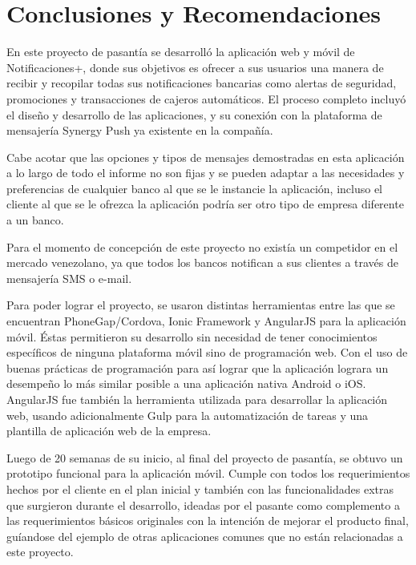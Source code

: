 \chapter{Conclusiones y Recomendaciones} 

\label{chap:conclusiones}

En este proyecto de pasantía se desarrolló la aplicación web y móvil de Notificaciones+, donde sus objetivos es ofrecer a sus usuarios una manera de recibir y recopilar todas sus notificaciones bancarias como alertas de seguridad, promociones y transacciones de cajeros automáticos. El proceso completo incluyó el diseño y desarrollo de las aplicaciones, y su conexión con la plataforma de mensajería Synergy Push ya existente en la compañía.


Cabe acotar que las opciones y tipos de mensajes demostradas en esta aplicación a lo largo de todo el informe no son fijas y se pueden adaptar a las necesidades y preferencias de cualquier banco al que se le instancie la aplicación, incluso el cliente al que se le ofrezca la aplicación podría ser otro tipo de empresa diferente a un banco.


Para el momento de concepción de este proyecto no existía un competidor en el mercado venezolano, ya que todos los bancos notifican a sus clientes a través de mensajería SMS o e-mail.


Para poder lograr el proyecto, se usaron distintas herramientas entre las que se encuentran PhoneGap/Cordova, Ionic Framework y AngularJS para la aplicación móvil. Éstas permitieron su desarrollo sin necesidad de tener conocimientos específicos de ninguna plataforma móvil sino de programación web. Con el uso de buenas prácticas de programación para así lograr que la aplicación lograra un desempeño lo más similar posible a una aplicación nativa Android o iOS. AngularJS fue también la herramienta utilizada para desarrollar la aplicación web, usando adicionalmente Gulp para la automatización de tareas y una plantilla de aplicación web de la empresa.


Luego de 20 semanas de su inicio, al final del proyecto de pasantía, se obtuvo un prototipo funcional para la aplicación móvil. Cumple con todos los requerimientos hechos por el cliente en el plan inicial y también con las funcionalidades extras que surgieron durante el desarrollo, ideadas por el pasante como complemento a las requerimientos básicos originales con la intención de mejorar el producto final, guíandose del ejemplo de otras aplicaciones comunes que no están relacionadas a este proyecto.


